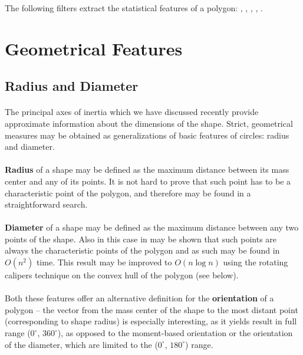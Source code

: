 \begin{refImpl}
The following \studio filters extract the statistical features of a polygon: 
, 
, 
, 
,
. 
\end{refImpl}

\section{Geometrical Features}

\subsection{Radius and Diameter}

\paragraph*{}
The principal axes of inertia which we have discussed recently provide approximate information about the dimensions of the shape. Strict, geometrical measures may be obtained as generalizations of basic features of circles: radius and diameter.

\paragraph*{}
\textbf{Radius} of a shape may be defined as the maximum distance between its mass center and any of its points. It is not hard to prove that such point has to be a characteristic point of the polygon, and therefore may be found in a straightforward search.

\paragraph*{}
\textbf{Diameter} of a shape may be defined as the maximum distance between any two points of the shape. Also in this case in may be shown that such points are always the characteristic points of the polygon and as such may be found in $O(n^2)$ time. This result may be improved to $O(n\log n)$ using the rotating calipers technique\cite{Toussaint83} on the convex hull of the polygon (see below).

\paragraph*{}
Both these features offer an alternative definition for the \textbf{orientation} of a polygon -- the vector from the mass center of the shape to the most distant point (corresponding to shape radius) is especially interesting, as it yields result in full range ($0^{\circ}$, $360^{\circ}$), as opposed to the moment-based orientation or the orientation of the diameter, which are limited to the ($0^{\circ}$, $180^{\circ}$) range.

